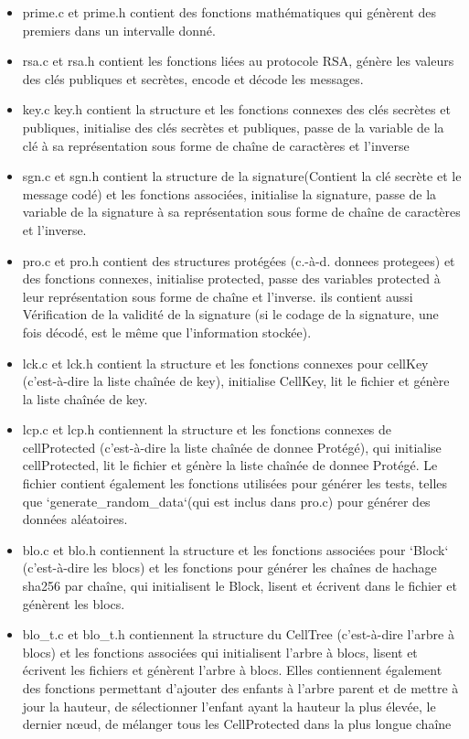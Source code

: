 \documentclass{article}
\begin{document}
\begin{itemize}
\item prime.c et prime.h contient des fonctions mathématiques qui génèrent des premiers dans un intervalle donné.
\item rsa.c et rsa.h contient les fonctions liées au protocole RSA, génère les valeurs des clés publiques et secrètes, encode et décode les messages.
\item key.c key.h contient la structure et les fonctions connexes des clés secrètes et publiques, initialise des clés secrètes et publiques, passe de la variable de la clé à sa représentation sous forme de chaîne de caractères et l'inverse
\item sgn.c et sgn.h contient la structure de la signature(Contient la clé secrète et le message codé) et les fonctions associées, initialise la signature, passe de la variable de la signature à sa représentation sous forme de chaîne de caractères et l'inverse.
\item pro.c et pro.h contient des structures protégées (c.-à-d. donnees protegees) et des fonctions connexes, initialise protected, passe des variables protected à leur représentation sous forme de chaîne et l'inverse. ils contient aussi Vérification de la validité de la signature (si le codage de la signature, une fois décodé, est le même que l'information stockée).
\item lck.c et lck.h contient la structure et les fonctions connexes pour cellKey (c'est-à-dire la liste chaînée de key), initialise CellKey, lit le fichier et génère la liste chaînée de key.
\item lcp.c et lcp.h contiennent la structure et les fonctions connexes de cellProtected (c'est-à-dire la liste chaînée de donnee Protégé), qui initialise cellProtected, lit le fichier et génère la liste chaînée de donnee Protégé. Le fichier contient également les fonctions utilisées pour générer les tests, telles que `generate\_random\_data`(qui est inclus dans pro.c) pour générer des données aléatoires.
\item blo.c et blo.h contiennent la structure et les fonctions associées pour `Block` (c'est-à-dire les blocs) et les fonctions pour générer les chaînes de hachage sha256 par chaîne, qui initialisent le Block, lisent et écrivent dans le fichier et génèrent les blocs.
\item blo\_t.c et blo\_t.h contiennent la structure du CellTree (c'est-à-dire l'arbre à blocs) et les fonctions associées qui initialisent l'arbre à blocs, lisent et écrivent les fichiers et génèrent l'arbre à blocs. Elles contiennent également des fonctions permettant d'ajouter des enfants à l'arbre parent et de mettre à jour la hauteur, de sélectionner l'enfant ayant la hauteur la plus élevée, le dernier nœud, de mélanger tous les CellProtected dans la plus longue chaîne

\end{itemize}
\end{document}
